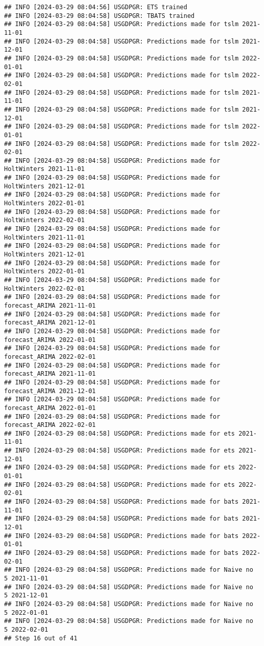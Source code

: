 \documentclass[
]{article}
\begin{document}
\begin{verbatim}
## INFO [2024-03-29 08:04:56] USGDPGR: ETS trained
## INFO [2024-03-29 08:04:58] USGDPGR: TBATS trained
## INFO [2024-03-29 08:04:58] USGDPGR: Predictions made for tslm 2021-11-01
## INFO [2024-03-29 08:04:58] USGDPGR: Predictions made for tslm 2021-12-01
## INFO [2024-03-29 08:04:58] USGDPGR: Predictions made for tslm 2022-01-01
## INFO [2024-03-29 08:04:58] USGDPGR: Predictions made for tslm 2022-02-01
## INFO [2024-03-29 08:04:58] USGDPGR: Predictions made for tslm 2021-11-01
## INFO [2024-03-29 08:04:58] USGDPGR: Predictions made for tslm 2021-12-01
## INFO [2024-03-29 08:04:58] USGDPGR: Predictions made for tslm 2022-01-01
## INFO [2024-03-29 08:04:58] USGDPGR: Predictions made for tslm 2022-02-01
## INFO [2024-03-29 08:04:58] USGDPGR: Predictions made for HoltWinters 2021-11-01
## INFO [2024-03-29 08:04:58] USGDPGR: Predictions made for HoltWinters 2021-12-01
## INFO [2024-03-29 08:04:58] USGDPGR: Predictions made for HoltWinters 2022-01-01
## INFO [2024-03-29 08:04:58] USGDPGR: Predictions made for HoltWinters 2022-02-01
## INFO [2024-03-29 08:04:58] USGDPGR: Predictions made for HoltWinters 2021-11-01
## INFO [2024-03-29 08:04:58] USGDPGR: Predictions made for HoltWinters 2021-12-01
## INFO [2024-03-29 08:04:58] USGDPGR: Predictions made for HoltWinters 2022-01-01
## INFO [2024-03-29 08:04:58] USGDPGR: Predictions made for HoltWinters 2022-02-01
## INFO [2024-03-29 08:04:58] USGDPGR: Predictions made for forecast_ARIMA 2021-11-01
## INFO [2024-03-29 08:04:58] USGDPGR: Predictions made for forecast_ARIMA 2021-12-01
## INFO [2024-03-29 08:04:58] USGDPGR: Predictions made for forecast_ARIMA 2022-01-01
## INFO [2024-03-29 08:04:58] USGDPGR: Predictions made for forecast_ARIMA 2022-02-01
## INFO [2024-03-29 08:04:58] USGDPGR: Predictions made for forecast_ARIMA 2021-11-01
## INFO [2024-03-29 08:04:58] USGDPGR: Predictions made for forecast_ARIMA 2021-12-01
## INFO [2024-03-29 08:04:58] USGDPGR: Predictions made for forecast_ARIMA 2022-01-01
## INFO [2024-03-29 08:04:58] USGDPGR: Predictions made for forecast_ARIMA 2022-02-01
## INFO [2024-03-29 08:04:58] USGDPGR: Predictions made for ets 2021-11-01
## INFO [2024-03-29 08:04:58] USGDPGR: Predictions made for ets 2021-12-01
## INFO [2024-03-29 08:04:58] USGDPGR: Predictions made for ets 2022-01-01
## INFO [2024-03-29 08:04:58] USGDPGR: Predictions made for ets 2022-02-01
## INFO [2024-03-29 08:04:58] USGDPGR: Predictions made for bats 2021-11-01
## INFO [2024-03-29 08:04:58] USGDPGR: Predictions made for bats 2021-12-01
## INFO [2024-03-29 08:04:58] USGDPGR: Predictions made for bats 2022-01-01
## INFO [2024-03-29 08:04:58] USGDPGR: Predictions made for bats 2022-02-01
## INFO [2024-03-29 08:04:58] USGDPGR: Predictions made for Naive no  5 2021-11-01
## INFO [2024-03-29 08:04:58] USGDPGR: Predictions made for Naive no  5 2021-12-01
## INFO [2024-03-29 08:04:58] USGDPGR: Predictions made for Naive no  5 2022-01-01
## INFO [2024-03-29 08:04:58] USGDPGR: Predictions made for Naive no  5 2022-02-01
## Step 16 out of 41
\end{verbatim}
\end{document}
